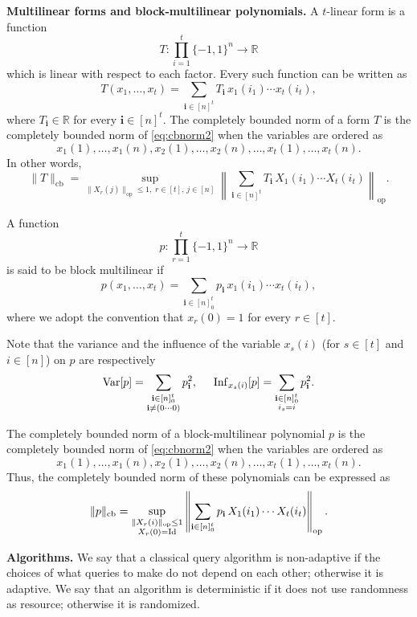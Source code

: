 \documentclass[11pt]{article}
\DeclareMathOperator{\cb}{cb}
\DeclareMathOperator{\op}{op}
\newcommand{\1}{\mathbf{1}}
\newcommand{\Id}{\ensuremath{\mathop{\rm Id}\nolimits}}
\newcommand{\ind}[1]{\mathbf{#1}}
\theoremstyle{plain}
\theoremstyle{definition}
\theoremstyle{remark}
\begin{document}
\textbf{Multilinear forms and block-multilinear polynomials.} A $t$-linear form is a function
\[
T:\prod_{i=1}^t\{-1,1\}^n\to\mathbb{R}
\]
which is linear with respect to each factor. Every such function can be written as
\[
T(x_1,\ldots,x_t)
=
\sum_{\ind i\in[n]^t}
T_{\ind i}\,
x_1(i_1)\cdots x_t(i_t),
\]
where $T_{\ind i}\in\mathbb{R}$ for every $\ind i\in [n]^t$. The completely bounded norm of a form $T$ is the completely bounded norm of \cref{eq:cbnorm2} when the variables are ordered as $$x_1(1),\dots,x_1(n),x_2(1),\dots,x_2(n),\dots,x_t(1),\dots,x_t(n).$$
In other words, 
\[
\|T\|_{\cb}
=
\sup_{\|X_r(j)\|_{\op}\le1,\;r\in[t],\,j\in[n]}
\left\|
\sum_{\ind i\in[n]^t}
T_{\ind i}\,
X_1(i_1)\cdots X_t(i_t)
\right\|_{\op}.
\]

A function
\[
p:\prod_{r=1}^t\{-1,1\}^n\to\mathbb{R}
\]
is said to be block multilinear if
\[
p(x_1,\ldots,x_t)
=
\sum_{\ind i\in[n]_0^t}
p_{\ind i}\,
x_1(i_1)\cdots x_t(i_t),
\]
where we adopt the convention that $x_r(0)=1$ for every $r\in[t]$. 


Note that the variance and the influence of the variable $x_s(i)$ (for $s\in [t]$ and $i\in [n]$) on $p$ are respectively 
\begin{align}\label{inf_block_mult}
\operatorname{Var}[p]=\sum_{\substack{\ind i\in[n]_0^t\\ \ind i\neq (0\cdots0)}}
p_{\ind i}^2,\hspace{0.5 cm} \operatorname{Inf}_{x_s(i)}[p]=\sum_{\substack{\ind i\in[n]_0^t\\ i_s=i}}
p_{\ind i}^2.
\end{align}






The completely bounded norm of a block-multilinear polynomial $p$ is the completely bounded norm of \cref{eq:cbnorm2} when the variables are ordered as $$x_1(1),\dots,x_1(n),x_2(1),\dots,x_2(n),\dots,x_t(1),\dots,x_t(n).$$
Thus, the completely bounded norm of these polynomials can be expressed as
\[
\|p\|_{\cb}
=
\sup_{\substack{\|X_r(i)\|_{\op}\le1\\ X_r(0)=\Id}}
\left\|
\sum_{\ind i\in[n]_0^t}
p_{\ind i}\,
X_1(i_1)\cdots X_t(i_t)
\right\|_{\op}.
\]




\textbf{Algorithms.} We say that a classical query algorithm is non-adaptive if the choices of what queries to make do not depend on each other; otherwise it is adaptive. We say that an algorithm is deterministic if it does not use randomness as resource; otherwise it is randomized.
\end{document}
